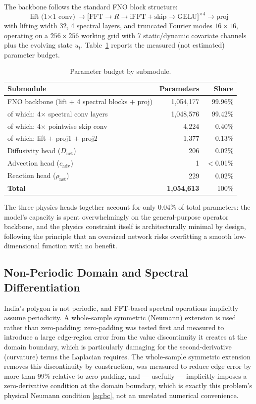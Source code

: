 \documentclass[journal]{IEEEtran}
\begin{document}
The backbone follows the standard FNO block structure:
\begin{equation}
\text{lift (1$\times$1 conv)} \to \big[\text{FFT} \to R \to \text{iFFT} + \text{skip} \to \text{GELU}\big]^{\times 4} \to \text{proj}
\end{equation}
with lifting width 32, 4 spectral layers, and truncated Fourier modes $16\times16$, operating on a $256\times256$ working grid with 7 static/dynamic covariate channels plus the evolving state $u_t$. Table~\ref{tab:params} reports the measured (not estimated) parameter budget.

\begin{table}[t]
\centering
\caption{Parameter budget by submodule.}
\label{tab:params}
\begin{tabular}{lrr}
\toprule
\textbf{Submodule} & \textbf{Parameters} & \textbf{Share} \\
\midrule
FNO backbone (lift $+$ 4 spectral blocks $+$ proj) & 1,054,177 & 99.96\% \\
\quad of which: 4$\times$ spectral conv layers & 1,048,576 & 99.42\% \\
\quad of which: 4$\times$ pointwise skip conv & 4,224 & 0.40\% \\
\quad of which: lift $+$ proj1 $+$ proj2 & 1,377 & 0.13\% \\
Diffusivity head ($D_{\mathrm{net}}$) & 206 & 0.02\% \\
Advection head ($c_{\mathrm{adv}}$) & 1 & $<$0.01\% \\
Reaction head ($\rho_{\mathrm{net}}$) & 229 & 0.02\% \\
\midrule
\textbf{Total} & \textbf{1,054,613} & 100\% \\
\bottomrule
\end{tabular}
\end{table}

The three physics heads together account for only 0.04\% of total parameters: the model's capacity is spent overwhelmingly on the general-purpose operator backbone, and the physics constraint itself is architecturally minimal by design, following the principle that an oversized network risks overfitting a smooth low-dimensional function with no benefit.

\subsection{Non-Periodic Domain and Spectral Differentiation}

India's polygon is not periodic, and FFT-based spectral operations implicitly assume periodicity. A whole-sample symmetric (Neumann) extension is used rather than zero-padding: zero-padding was tested first and measured to introduce a large edge-region error from the value discontinuity it creates at the domain boundary, which is particularly damaging for the second-derivative (curvature) terms the Laplacian requires. The whole-sample symmetric extension removes this discontinuity by construction, was measured to reduce edge error by more than 99\% relative to zero-padding, and --- usefully --- implicitly imposes a zero-derivative condition at the domain boundary, which is exactly this problem's physical Neumann condition \eqref{eq:bc}, not an unrelated numerical convenience.
\end{document}
